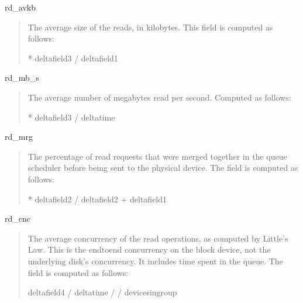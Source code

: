 \documentclass[letterpaper,10pt,english]{sphinxmanual}
\begin{document}
\sphinxAtStartPar
rd\_avkb
\begin{quote}

\sphinxAtStartPar
The average size of the reads, in kilobytes.  This field is computed as follows:

\begin{sphinxVerbatim}[commandchars=\\\{\}]
 * delta\PYG{o}{[}field3\PYG{o}{]} / delta\PYG{o}{[}field1\PYG{o}{]}
\end{sphinxVerbatim}
\end{quote}

\sphinxAtStartPar
rd\_mb\_s
\begin{quote}

\sphinxAtStartPar
The average number of megabytes read per second.  Computed as follows:

\begin{sphinxVerbatim}[commandchars=\\\{\}]
 * delta\PYG{o}{[}field3\PYG{o}{]} / delta\PYG{o}{[}time\PYG{o}{]}
\end{sphinxVerbatim}
\end{quote}

\sphinxAtStartPar
rd\_mrg
\begin{quote}

\sphinxAtStartPar
The percentage of read requests that were merged together in the queue scheduler
before being sent to the physical device.  The field is computed as follows:

\begin{sphinxVerbatim}[commandchars=\\\{\}]
 * delta\PYG{o}{[}field2\PYG{o}{]} / delta\PYG{o}{[}field2\PYG{o}{]} + delta\PYG{o}{[}field1\PYG{o}{]}
\end{sphinxVerbatim}
\end{quote}

\sphinxAtStartPar
rd\_cnc
\begin{quote}

\sphinxAtStartPar
The average concurrency of the read operations, as computed by Little’s Law.
This is the end\sphinxhyphen{}to\sphinxhyphen{}end concurrency on the block device, not the underlying
disk’s concurrency. It includes time spent in the queue.  The field is computed
as follows:

\begin{sphinxVerbatim}[commandchars=\\\{\}]
delta\PYG{o}{[}field4\PYG{o}{]} / delta\PYG{o}{[}time\PYG{o}{]} /  / devices\PYGZhy{}in\PYGZhy{}group
\end{sphinxVerbatim}
\end{quote}
\end{document}
